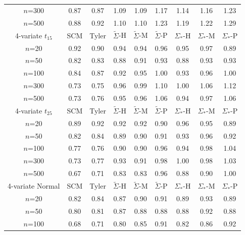 \begin{table}[t]
\begin{scriptsize}
\begin{tabular}{c|cc|ccc|ccc}
    $n$=300            & 0.87 & 0.87  & 1.09   & 1.09   & 1.17  & 1.14    & 1.16    & 1.23   \\
    $n$=500            & 0.88 & 0.92  & 1.10   & 1.10   & 1.23  & 1.19    & 1.22    & 1.29   \\ \hline
    4-variate $t_{15}$  & SCM  & Tyler & $\tilde{\Sigma}$-H & $\tilde{\Sigma}$-M & $\tilde{\Sigma}$-P & ${\Sigma}_{*}$-H & ${\Sigma}_{*}$-M & ${\Sigma}_{*}$-P \\ \hline
    $n$=20             & 0.92 & 0.90  & 0.94   & 0.94   & 0.96  & 0.95    & 0.97    & 0.89   \\
    $n$=50             & 0.82 & 0.83  & 0.88   & 0.91   & 0.93  & 0.88    & 0.93    & 0.93   \\
    $n$=100            & 0.84 & 0.87  & 0.92   & 0.95   & 1.00  & 0.93    & 0.96    & 1.00   \\
    $n$=300            & 0.73 & 0.75  & 0.96   & 0.99   & 1.10  & 1.00    & 1.06    & 1.12   \\
    $n$=500            & 0.73 & 0.76  & 0.95   & 0.96   & 1.06  & 0.94    & 0.97    & 1.06   \\ \hline
    4-variate $t_{25}$  & SCM  & Tyler & $\tilde{\Sigma}$-H & $\tilde{\Sigma}$-M & $\tilde{\Sigma}$-P & ${\Sigma}_{*}$-H & ${\Sigma}_{*}$-M & ${\Sigma}_{*}$-P \\ \hline
    $n$=20             & 0.89 & 0.92  & 0.92   & 0.92   & 0.90  & 0.96    & 0.95    & 0.89   \\
    $n$=50             & 0.82 & 0.84  & 0.89   & 0.90   & 0.91  & 0.93    & 0.96    & 0.92   \\
    $n$=100            & 0.77 & 0.76  & 0.90   & 0.90   & 0.96  & 0.94    & 0.98    & 1.04   \\
    $n$=300            & 0.73 & 0.77  & 0.93   & 0.91   & 0.98  & 1.00    & 0.98    & 1.03   \\
    $n$=500            & 0.67 & 0.71  & 0.83   & 0.83   & 0.96  & 0.88    & 0.90    & 1.00   \\ \hline
    4-variate Normal   & SCM  & Tyler & $\tilde{\Sigma}$-H & $\tilde{\Sigma}$-M & $\tilde{\Sigma}$-P & ${\Sigma}_{*}$-H & ${\Sigma}_{*}$-M & ${\Sigma}_{*}$-P \\ \hline
    $n$=20             & 0.82 & 0.84  & 0.87   & 0.90   & 0.91  & 0.89    & 0.93    & 0.89   \\
    $n$=50             & 0.80 & 0.81  & 0.87   & 0.88   & 0.88  & 0.88    & 0.92    & 0.88   \\
    $n$=100            & 0.68 & 0.71  & 0.80   & 0.85   & 0.91  & 0.82    & 0.86    & 0.92   \\

\end{tabular}
\end{scriptsize}
\end{table}
